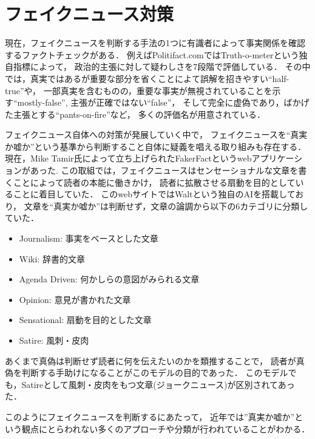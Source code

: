 \section{フェイクニュース対策}
現在，フェイクニュースを判断する手法の1つに有識者によって事実関係を確認するファクトチェックがある．
例えばPolitifact.comではTruth-o-meterという独自指標によって，
政治的主張に対して疑わしさを7段階で評価\cite{holan_2018}している．
その中では，真実ではあるが重要な部分を省くことによて誤解を招きやすい``half-true''や，
一部真実を含むものの，重要な事実が無視されていることを示す``mostly-false'',
主張が正確ではない``false''，
そして完全に虚偽であり，ばかげた主張とする``pants-on-fire''など，
多くの評価名が用意されている．

フェイクニュース自体への対策が発展していく中で，
フェイクニュースを``真実か嘘か''という基準から判断すること自体に疑義を唱える取り組みも存在する．
現在，Mike Tamir氏によって立ち上げられたFakerFactというwebアプリケーションがあった\cite{tamir}.
この取組では，フェイクニュースはセンセーショナルな文章を書くことによって読者の本能に働きかけ，
読者に拡散させる扇動を目的としていることに着目していた．
このwebサイトではWaltという独自のAIを搭載しており，
文章を``真実か嘘か''は判断せず，文章の論調から以下の6カテゴリに分類していた．

\begin{itemize}
    \item Journalism: 事実をベースとした文章
    \item Wiki: 辞書的文章
    \item Agenda Driven: 何かしらの意図がみられる文章
    \item Opinion: 意見が書かれた文章
    \item Sensational: 扇動を目的とした文章
    \item Satire: 風刺・皮肉
\end{itemize}

あくまで真偽は判断せず読者に何を伝えたいのかを類推することで，
読者が真偽を判断する手助けになることがこのモデルの目的であった．
このモデルでも，Satireとして風刺・皮肉をもつ文章(ジョークニュース)が区別されてあった．

このようにフェイクニュースを判断するにあたって，
近年では''真実か嘘か''という観点にとらわれない多くのアプローチや分類が行われていることがわかる．
